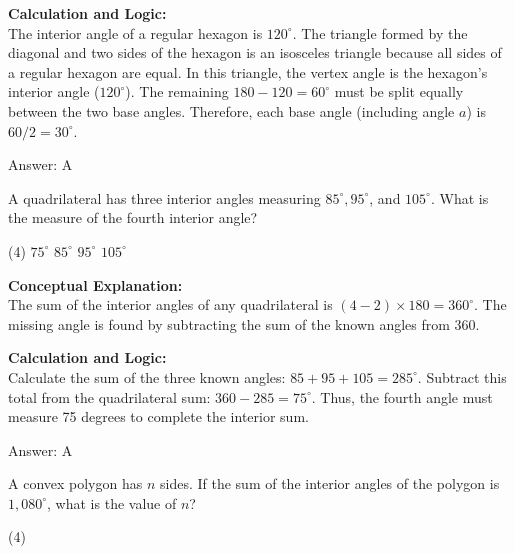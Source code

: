 \documentclass[11pt,paper=a4,answers]{exam}
\begin{document}
\begin{questions}
\begin{solution}
\vspace{30pt}

\textbf{Calculation and Logic:} \\
The interior angle of a regular hexagon is $120^\circ$. The triangle formed by the diagonal and two sides of the hexagon is an isosceles triangle because all sides of a regular hexagon are equal. In this triangle, the vertex angle is the hexagon's interior angle ($120^\circ$). The remaining $180 - 120 = 60^\circ$ must be split equally between the two base angles. Therefore, each base angle (including angle $a$) is $60 / 2 = 30^\circ$.

\vspace{30pt}

Answer: \colorbox{yellow!100}{A}
\end{solution}

\vspace{60pt}

\question
A quadrilateral has three interior angles measuring $85^\circ, 95^\circ$, and $105^\circ$. What is the measure of the fourth interior angle?
\begin{tasks}(4)
    \task $75^\circ$
    \task $85^\circ$
    \task $95^\circ$
    \task $105^\circ$
\end{tasks}

\begin{solution}
\textbf{Conceptual Explanation:} \\
The sum of the interior angles of any quadrilateral is $(4 - 2) \times 180 = 360^\circ$. The missing angle is found by subtracting the sum of the known angles from 360.

\vspace{30pt}

\textbf{Calculation and Logic:} \\
Calculate the sum of the three known angles: $85 + 95 + 105 = 285^\circ$. Subtract this total from the quadrilateral sum: $360 - 285 = 75^\circ$. Thus, the fourth angle must measure 75 degrees to complete the interior sum.

\vspace{30pt}

Answer: \colorbox{yellow!100}{A}
\end{solution}


\question
A convex polygon has $n$ sides. If the sum of the interior angles of the polygon is $1,080^\circ$, what is the value of $n$?
\begin{tasks}(4)
\end{tasks}


\end{questions}
\end{document}
